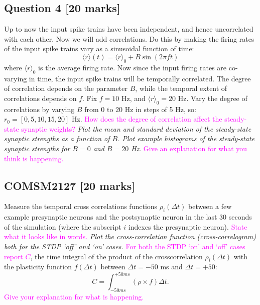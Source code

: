 \documentclass[12pt]{article}
\begin{document}
\subsection*{Question 4 [20 marks]} Up to now the input spike trains have been independent,
and hence uncorrelated with each other. Now we will add correlations.
Do this by making the firing rates of the input spike trains vary
as a sinusoidal function of time:
\[
\langle r\rangle(t)=\langle r\rangle_{0}+B\sin(2\pi ft)
\]
where $\langle r\rangle_{0}$ is the average firing rate. Now since
the input firing rates are co-varying in time, the input spike trains
will be temporally correlated. The degree of correlation depends on
the parameter $B$, while the temporal extent of correlations depends
on $f$. Fix $f=10$ Hz, and $\langle r\rangle_{0}=20$ Hz. Vary the
degree of correlations by varying $B$ from $0$ to $20$ Hz in steps of 5 Hz, so: $r_0=[0, 5, 10, 15, 20]$ Hz. \textcolor{magenta}{How
does the degree of correlation affect the steady-state synaptic weights?}
\emph{Plot the mean and standard deviation of the steady-state synaptic
strengths as a function of $B$. Plot example histograms of the steady-state
synaptic strengths for $B=0$ and $B=20$ Hz}. \textcolor{magenta}{Give an explanation for what you think is
happening.}

\subsection*{COMSM2127 [20 marks]} Measure the temporal cross correlations functions
$\rho_{i}(\Delta t)$ between a few example presynaptic neurons and
the postsynaptic neuron in the last 30 seconds of the simulation (where the subscript $i$ indexes the presynaptic
neuron). \textcolor{magenta}{State what it looks like in words.} \emph{Plot the
cross-correlation function (cross-correlogram) both for the STDP `off'
and `on' cases.} \textcolor{magenta} {For both the STDP `on' and `off' cases report $C$}, the time integral of
the product of the crosscorrelation $\rho_i(\Delta t)$ with the plasticity function $f(\Delta t)$ between $\Delta t=-50$ ms and $\Delta t=+50$:
\[
C = \int_{-50 ms}^{+50 ms} (\rho \times f) \Delta t.
\] \textcolor{magenta} {Give your explanation for what is
happening.}

\end{document}
